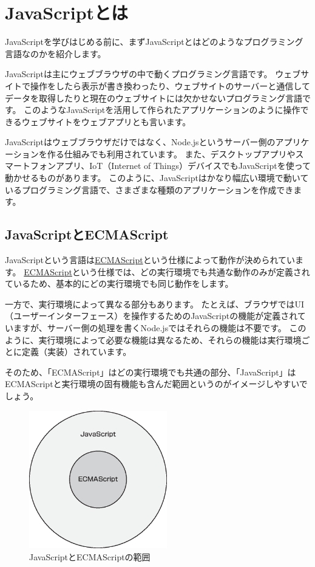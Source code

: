 \hypertarget{what-is-javascript}{%
\chapter{JavaScriptとは}\label{what-is-javascript}}
\thispagestyle{frontheadings}

JavaScriptを学びはじめる前に、まずJavaScriptとはどのようなプログラミング言語なのかを紹介します。

JavaScriptは主にウェブブラウザの中で動くプログラミング言語です。
ウェブサイトで操作をしたら表示が書き換わったり、ウェブサイトのサーバーと通信してデータを取得したりと現在のウェブサイトには欠かせないプログラミング言語です。
このようなJavaScriptを活用して作られたアプリケーションのように操作できるウェブサイトをウェブアプリとも言います。

JavaScriptはウェブブラウザだけではなく、Node.jsというサーバー側のアプリケーションを作る仕組みでも利用されています。
また、デスクトップアプリやスマートフォンアプリ、IoT（Internet of
Things）デバイスでもJavaScriptを使って動かせるものがあります。
このように、JavaScriptはかなり幅広い環境で動いているプログラミング言語で、さまざまな種類のアプリケーションを作成できます。

\hypertarget{javascript-ecmascript}{%
\section{JavaScriptとECMAScript}\label{javascript-ecmascript}}

JavaScriptという言語は\href{../ecmascript/README.md}{ECMAScript}という仕様によって動作が決められています。
\href{../ecmascript/README.md}{ECMAScript}という仕様では、どの実行環境でも共通な動作のみが定義されているため、基本的にどの実行環境でも同じ動作をします。

一方で、実行環境によって異なる部分もあります。
たとえば、ブラウザではUI（ユーザーインターフェース）を操作するためのJavaScriptの機能が定義されていますが、サーバー側の処理を書くNode.jsではそれらの機能は不要です。
このように、実行環境によって必要な機能は異なるため、それらの機能は実行環境ごとに定義（実装）されています。

そのため、「ECMAScript」はどの実行環境でも共通の部分、「JavaScript」はECMAScriptと実行環境の固有機能も含んだ範囲というのがイメージしやすいでしょう。

\begin{figure}
\centering
\includegraphics[width=60mm]{./fig/javascript-ecmascript.eps}
\caption{JavaScriptとECMAScriptの範囲}
\end{figure}

